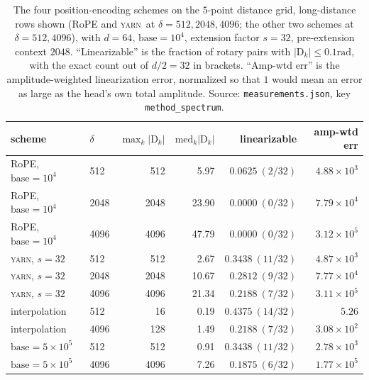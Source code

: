 \documentclass{article}
\theoremstyle{plain}
\theoremstyle{remark}
\newcommand{\yarn}{\textsc{yarn}}
\newcommand{\D}{\mathrm{D}_k}
\newcommand{\half}{d/2}
\newcommand{\rad}{\mathrm{rad}}
\begin{document}
\begin{table}[t]
  \centering
  \caption{The four position-encoding schemes on the $5$-point distance grid,
    long-distance rows shown (RoPE and \yarn\ at $\delta = 512, 2048, 4096$;
    the other two schemes at $\delta = 512, 4096$), with $d = 64$,
    $\mathrm{base} = 10^{4}$, extension factor $s = 32$, pre-extension
    context $2048$. ``Linearizable'' is the fraction of rotary pairs with
    $|\D| \le 0.1\rad$, with the exact count out of $\half = 32$ in brackets.
    ``Amp-wtd err'' is the amplitude-weighted linearization error, normalized so
    that $1$ would mean an error as large as the head's own total amplitude.
    Source: \texttt{measurements.json}, key \texttt{method\_spectrum}.}
  \label{tab:spectrum}
  \setlength{\tabcolsep}{3.6pt}
  \begin{tabular}{llrrrr}
    \toprule
    scheme & $\delta$ & $\max_k|\D|$ & $\mathrm{med}_k|\D|$
      & linearizable & amp-wtd err \\
    \midrule
    RoPE, $\mathrm{base}=10^{4}$ & 512 & 512 & 5.97
      & $0.0625\ (2/32)$ & $4.88\!\times\!10^{3}$ \\
    RoPE, $\mathrm{base}=10^{4}$ & 2048 & 2048 & 23.90
      & $0.0000\ (0/32)$ & $7.79\!\times\!10^{4}$ \\
    RoPE, $\mathrm{base}=10^{4}$ & 4096 & 4096 & 47.79
      & $0.0000\ (0/32)$ & $3.12\!\times\!10^{5}$ \\
    \midrule
    \yarn, $s=32$ & 512 & 512 & 2.67
      & $0.3438\ (11/32)$ & $4.87\!\times\!10^{3}$ \\
    \yarn, $s=32$ & 2048 & 2048 & 10.67
      & $0.2812\ (9/32)$ & $7.77\!\times\!10^{4}$ \\
    \yarn, $s=32$ & 4096 & 4096 & 21.34
      & $0.2188\ (7/32)$ & $3.11\!\times\!10^{5}$ \\
    \midrule
    interpolation & 512 & 16 & 0.19
      & $0.4375\ (14/32)$ & $5.26$ \\
    interpolation & 4096 & 128 & 1.49
      & $0.2188\ (7/32)$ & $3.08\!\times\!10^{2}$ \\
    \midrule
    $\mathrm{base}=5\!\times\!10^{5}$ & 512 & 512 & 0.91
      & $0.3438\ (11/32)$ & $2.78\!\times\!10^{3}$ \\
    $\mathrm{base}=5\!\times\!10^{5}$ & 4096 & 4096 & 7.26
      & $0.1875\ (6/32)$ & $1.77\!\times\!10^{5}$ \\
    \bottomrule
  \end{tabular}
\end{table}
\end{document}
